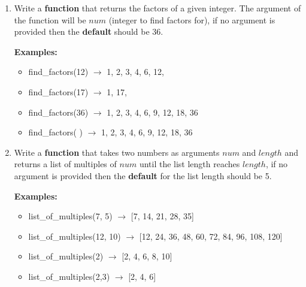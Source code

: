 \documentclass{article}
\begin{document}
\begin{enumerate}
	\item 
		Write a \textbf{function} that returns the factors of a given integer. 
		The argument of the function will be $num$ (integer to find factors for), 
		if no argument is provided then the \textbf{default} should be 36.

		\textbf{Examples:}		
		\begin{itemize}
			\item  find\_factors(12) $\rightarrow$ 1, 2, 3, 4, 6, 12, 
			\item  find\_factors(17) $\rightarrow$ 1, 17,
			\item  find\_factors(36) $\rightarrow$ 1, 2, 3, 4, 6, 9, 12, 18, 36
			\item  find\_factors( ) $\rightarrow$ 1, 2, 3, 4, 6, 9, 12, 18, 36
		\end{itemize}


	\item
		Write a \textbf{function} that takes two numbers as arguments $num$ and $length$ and 
		returns a list of multiples of $num$ until the list length reaches $length$, if no 
		argument is provided then the \textbf{default} for the list length should be 5.

		\textbf{Examples:}		
		\begin{itemize}
			\item  list\_of\_multiples(7, 5) $\rightarrow$ [7, 14, 21, 28, 35]
			\item  list\_of\_multiples(12, 10) $\rightarrow$ [12, 24, 36, 48, 60, 72, 84, 96, 108, 120]
			\item  list\_of\_multiples(2) $\rightarrow$ [2, 4, 6, 8, 10]
			\item  list\_of\_multiples(2,3) $\rightarrow$ [2, 4, 6]
		\end{itemize}






\end{enumerate}
\end{document}
